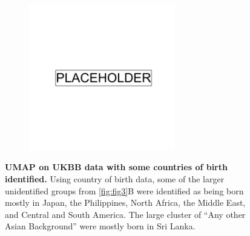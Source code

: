 \newpage

\begin{figure}
    \centering
    \begin{subfigure}{0.8\textwidth}
    \includegraphics[width=0.7\textwidth]{placeholder.png}
    \end{subfigure}
    \caption[UMAP on UKBB data with some countries of birth identified]{\textbf{UMAP on UKBB data with some countries of birth identified.} Using country of birth data, some of the larger unidentified groups from \ref{fig:fig3}B were identified as being born mostly in Japan, the Philippines, North Africa, the Middle East, and Central and South America. The large cluster of ``Any other Asian Background'' were mostly born in Sri Lanka.}
    \label{fig:supp_ukbb_cob}
\end{figure}

\newpage

